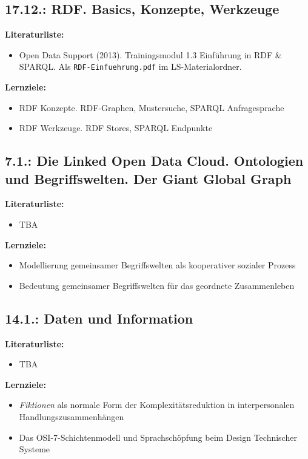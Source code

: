 \documentclass[11pt,a4paper]{article}
\begin{document}
\subsection{17.12.: RDF. Basics, Konzepte, Werkzeuge}

\textbf{Literaturliste:}
\begin{itemize}
\item Open Data Support (2013). Trainingsmodul 1.3 Einführung
  in RDF \& SPARQL.  Als \texttt{RDF-Einfuehrung.pdf} im LS-Materialordner.
\end{itemize}

\textbf{Lernziele:}
\begin{itemize}[noitemsep]
\item RDF Konzepte. RDF-Graphen, Mustersuche, SPARQL Anfragesprache
\item RDF Werkzeuge. RDF Stores, SPARQL Endpunkte
\end{itemize}

\subsection{7.1.: Die Linked Open Data Cloud. Ontologien und Begriffswelten.
Der Giant Global Graph}

\textbf{Literaturliste:}
\begin{itemize}
\item TBA
\end{itemize}

\textbf{Lernziele:}
\begin{itemize}[noitemsep]
\item Modellierung gemeinsamer Begriffswelten als kooperativer sozialer
  Prozess 
\item Bedeutung gemeinsamer Begriffswelten für das geordnete Zusammenleben 
\end{itemize}

\subsection{14.1.: Daten und Information}

\textbf{Literaturliste:}
\begin{itemize}
\item TBA
\end{itemize}

\textbf{Lernziele:}
\begin{itemize}[noitemsep]
\item \emph{Fiktionen} als normale Form der Komplexitätsreduktion in
  interpersonalen Handlungszusammenhängen
\item Das OSI-7-Schichtenmodell und Sprachschöpfung beim Design Technischer
  Systeme  
\end{itemize}
\end{document}
